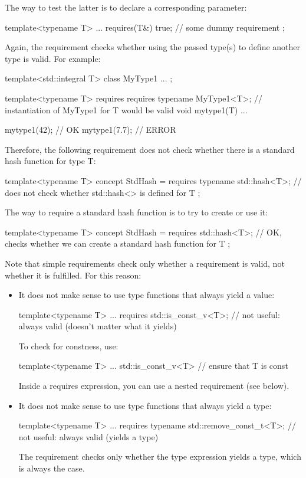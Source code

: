 The way to test the latter is to declare a corresponding parameter:

\begin{cpp}
template<typename T>
... requires(T&) {
	true; // some dummy requirement
};
\end{cpp}

Again, the requirement checks whether using the passed type(s) to define another type is valid. For example:

\begin{cpp}
template<std::integral T>
class MyType1 {
	...
};

template<typename T>
requires requires {
	typename MyType1<T>; // instantiation of MyType1 for T would be valid
}
void mytype1(T) {
	...
}

mytype1(42); // OK
mytype1(7.7); // ERROR
\end{cpp}

Therefore, the following requirement does not check whether there is a standard hash function for type T:

\begin{cpp}
template<typename T>
concept StdHash = requires {
	typename std::hash<T>; // does not check whether std::hash<> is defined for T
};
\end{cpp}

The way to require a standard hash function is to try to create or use it:

\begin{cpp}
template<typename T>
concept StdHash = requires {
	std::hash<T>{}; // OK, checks whether we can create a standard hash function for T
};
\end{cpp}

Note that simple requirements check only whether a requirement is valid, not whether it is fulfilled. For this reason:

\begin{itemize}
\item
It does not make sense to use type functions that always yield a value:

\begin{cpp}
template<typename T>
... requires {
	std::is_const_v<T>; // not useful: always valid (doesn’t matter what it yields)
}
\end{cpp}

To check for constness, use:

\begin{cpp}
template<typename T>
... std::is_const_v<T> // ensure that T is const
\end{cpp}

Inside a requires expression, you can use a nested requirement (see below).

\item
It does not make sense to use type functions that always yield a type:

\begin{cpp}
template<typename T>
... requires {
	typename std::remove_const_t<T>; // not useful: always valid (yields a type)
}
\end{cpp}

The requirement checks only whether the type expression yields a type, which is always the case.
\end{itemize}

